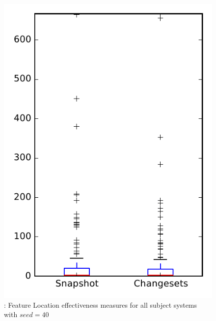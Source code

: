 
\begin{figure}
\centering
\includegraphics[height=0.4\textheight]{figures/flt_seed/rq1_overview_40}
\caption{\rone: Feature Location effectiveness measures for all subject systems with $seed=40$}
\label{fig:flt_seed:rq1:overview}
\end{figure}
